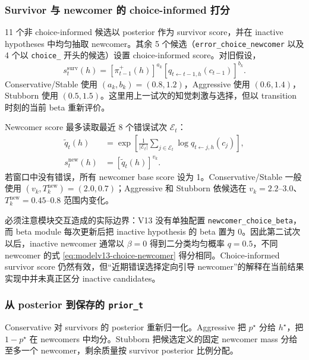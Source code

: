 \subsubsection{Survivor 与 newcomer 的 choice-informed 打分}

11 个非 choice-informed 候选以 posterior 作为 survivor score，并在 inactive hypotheses 中均匀抽取 newcomer。其余 5 个候选（\texttt{error\_choice\_newcomer} 以及 4 个以 \texttt{choice\_} 开头的候选）设置 choice-informed score。对旧假设，
\begin{equation}
    s_t^{\mathrm{surv}}(h)
    =[\pi_{t-1}^{+}(h)]^{a_k}
    [q_{t\leftarrow t-1,h}(c_{t-1})]^{b_k}.
    \label{eq:modelv13-choice-survivor}
\end{equation}
Conservative/Stable 使用 $(a_k,b_k)=(0.8,1.2)$，Aggressive 使用 $(0.6,1.4)$，Stubborn 使用 $(0.5,1.5)$。这里用上一试次的知觉刺激与选择，但以 transition 时刻的当前 beta 重新评价。

Newcomer score 最多读取最近 8 个错误试次 $\mathcal E_t$：
\begin{align}
    \widetilde q_t(h)
    &=\exp\left[
      \frac{1}{|\mathcal E_t|}
      \sum_{j\in\mathcal E_t}\log q_{t\leftarrow j,h}(c_j)
    \right],\\
    s_t^{\mathrm{new}}(h)&=[\widetilde q_t(h)]^{v_k}.
    \label{eq:modelv13-choice-newcomer}
\end{align}
若窗口中没有错误，所有 newcomer base score 设为 1。Conservative/Stable 一般使用 $(v_k,T_k^{\mathrm{new}})=(2.0,0.7)$；Aggressive 和 Stubborn 依候选在 $v_k=2.2$--$3.0$、$T_k^{\mathrm{new}}=0.45$--$0.8$ 范围内变化。

必须注意模块交互造成的实际边界：V13 没有单独配置 \texttt{newcomer\_choice\_beta}，而 beta module 每次更新后把 inactive hypothesis 的 beta 置为 0。因此第二试次以后，inactive newcomer 通常以 $\beta=0$ 得到二分类均匀概率 $q=0.5$，不同 newcomer 的式 \ref{eq:modelv13-choice-newcomer} 得分相同。Choice-informed survivor score 仍然有效，但“近期错误选择定向引导 newcomer”的解释在当前结果实现中并未真正区分 inactive candidates。


\subsubsection{从 posterior 到保存的 \texttt{prior\_t}}

Conservative 对 survivors 的 posterior 重新归一化。Aggressive 把 $p^\star$ 分给 $h^\star$，把 $1-p^\star$ 在 newcomers 中均分。Stubborn 把候选定义的固定 newcomer mass 分给至多一个 newcomer，剩余质量按 survivor posterior 比例分配。

